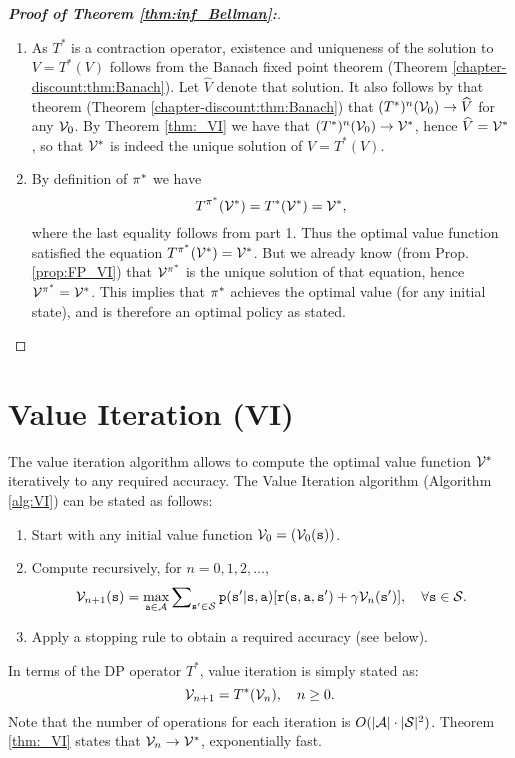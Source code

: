 \begin{proof}[\textbf{Proof of Theorem \ref{thm:inf_Bellman}:}]
\begin{enumerate}
\item
As $T_{}^*$ is a contraction operator, existence and uniqueness of
the solution to $V = T_{}^*(V)$ follows from the Banach fixed point
theorem (Theorem \ref{chapter-discount:thm:Banach}). Let $\widehat{V}$
denote that solution. It also follows by that theorem  (Theorem
\ref{chapter-discount:thm:Banach}) that ${(T_{}^*)^n}({\mathcal{V}_0})
\to \widehat{V}$ for any ${\mathcal{V}_0}$. By Theorem \ref{thm:_VI} we have
that ${(T_{}^*)^n}({\mathcal{V}_0}) \to \mathcal{V}_{}^*$, hence $\widehat{V} =
\mathcal{V}_{}^*$,  so that $\mathcal{V}_{}^*$ is indeed the unique solution
of  $V = T_{}^*(V)$.
%
  \item By definition of  ${\pi ^*}$ we have
\[T_{}^{\pi^*}(\mathcal{V}_{}^*) = T_{}^*(\mathcal{V}_{}^*) = \mathcal{V}_{}^*,\]
where the last equality follows from part 1. Thus the optimal value
function satisfied the equation $T_{}^{\pi^*}(\mathcal{V}_{}^*) =
\mathcal{V}_{}^*$. But we already know (from Prop. \ref{prop:FP_VI}) that
$\mathcal{V}_{}^{\pi^*}$ is the unique solution of that equation,
hence $\mathcal{V}_{}^{\pi^*} = \mathcal{V}_{}^*$. This implies that
${\pi ^*}$ achieves the optimal value (for any initial state),
and is therefore an optimal policy as stated.
\end{enumerate}
\end{proof}

\section{Value Iteration (VI)}
\label{sec:VI}

The value iteration algorithm allows to compute the optimal value
function ${\mathcal{V}^*}$ iteratively to any required accuracy. The
Value Iteration algorithm (Algorithm \ref{alg:VI}) can be stated as
follows:
\begin{enumerate}
  \item Start with any initial value function ${\mathcal{V}_0} = ({\mathcal{V}_0}({\tt s}))$.
  \item Compute recursively, for $n = 0,1,2, \ldots $,
          \[{\mathcal{V}_{n + 1}}({\tt s}) = \mathop {\max }\limits_{{\tt a} \in \mathcal{A}} \sum\nolimits_{{\tt s}' \in \mathcal{S}} {{\tt p}({\tt s}'|{\tt s},{\tt a})[{\tt r}({\tt s},{\tt a},{\tt s}') + \gamma {\mathcal{V}_n}({\tt s}')]} ,       \quad \forall {\tt s} \in \mathcal{S}.\]
  \item Apply a stopping rule to obtain a required accuracy (see below).
\end{enumerate}
In terms of the DP operator $T_{}^*$, value iteration is simply stated as:
\[{\mathcal{V}_{n + 1}} = T_{}^*({\mathcal{V}_n}), \quad n \ge 0.\]
Note that the number of operations for each iteration is
$O(|\mathcal{A}| \cdot |\mathcal{S}|^2)$. Theorem \ref{thm:_VI} states that
${\mathcal{V}_n} \to \mathcal{V}_{}^*$, exponentially fast. %




